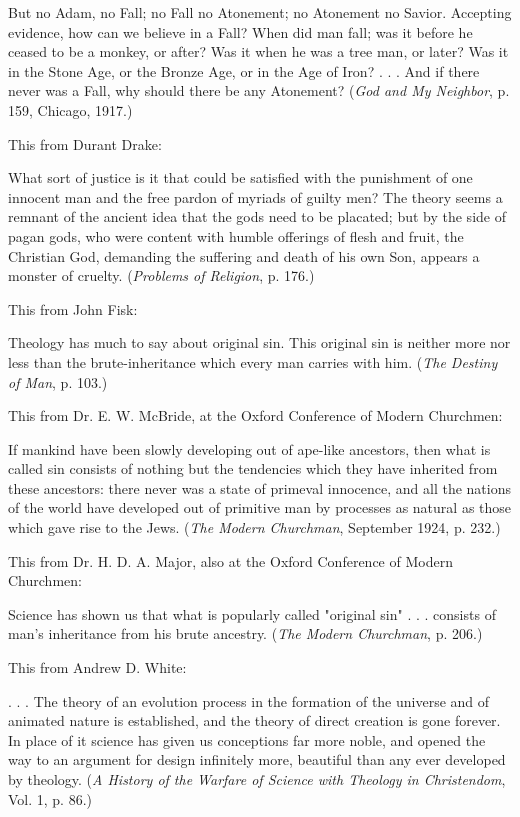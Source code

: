 But no Adam, no Fall; no Fall no Atonement; no Atonement no Savior. Accepting evidence,
how can we believe in a Fall? When did man fall; was it before he ceased to be a monkey, or
after? Was it when he was a tree man, or later? Was it in the Stone Age, or the Bronze Age,
or in the Age of Iron? . . . And if there never was a Fall, why should there be any Atonement?
(\textit{God and My Neighbor}, p. 159, Chicago, 1917.)

This from Durant Drake:

What sort of justice is it that could be satisfied with the punishment of one innocent man and
the free pardon of myriads of guilty men? The theory seems a remnant of the ancient idea
that the gods need to be placated; but by the side of pagan gods, who were content with
humble offerings of flesh and fruit, the Christian God, demanding the suffering and death of
his own Son, appears a monster of cruelty. (\textit{Problems of Religion}, p. 176.)

This from John Fisk:

Theology has much to say about original sin. This original sin is neither more nor less than
the brute-inheritance which every man carries with him. (\textit{The Destiny of Man}, p. 103.)

This from Dr. E. W. McBride, at the Oxford Conference of Modern Churchmen:

If mankind have been slowly developing out of ape-like ancestors, then what is called sin
consists of nothing but the tendencies which they have inherited from these ancestors: there
never was a state of primeval innocence, and all the nations of the world have developed out
of primitive man by processes as natural as those which gave rise to the Jews. (\textit{The Modern
Churchman}, September 1924, p. 232.)

This from Dr. H. D. A. Major, also at the Oxford Conference of Modern Churchmen:

Science has shown us that what is popularly called "original sin" . . . consists of man's
inheritance from his brute ancestry. (\textit{The Modern Churchman}, p. 206.)

This from Andrew D. White:

. . . The theory of an evolution process in the formation of the universe and of animated
nature is established, and the theory of direct creation is gone forever. In place of it science
has given us conceptions far more noble, and opened the way to an argument for design
infinitely more, beautiful than any ever developed by theology. (\textit{A History of the Warfare of
Science with Theology in Christendom}, Vol. 1, p. 86.)

